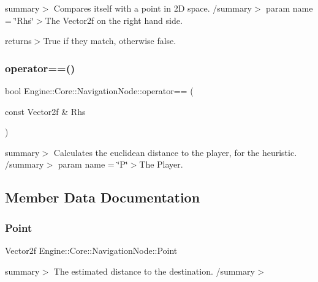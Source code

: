 summary$>$ Compares itself with a point in 2D space. /summary$>$ param name = \char`\"{}\+Rhs\char`\"{}$>$The Vector2f on the right hand side.

returns$>$True if they match, otherwise false.\mbox{\label{struct_engine_1_1_core_1_1_navigation_node_a4093291628771c2de79b2b1a8ea2ec82}} 
\subsubsection{\texorpdfstring{operator==()}{operator==()}\hspace{0.1cm}{\footnotesize\ttfamily [2/2]}}
{\footnotesize\ttfamily bool Engine\+::\+Core\+::\+Navigation\+Node\+::operator== (\begin{DoxyParamCaption}\item[{const Vector2f \&}]{Rhs }\end{DoxyParamCaption})}

summary$>$ Calculates the euclidean distance to the player, for the heuristic. /summary$>$ param name = \char`\"{}\+P\char`\"{}$>$The Player.

\subsection{Member Data Documentation}
\mbox{\label{struct_engine_1_1_core_1_1_navigation_node_a09e7506d996f8bd91b478f3e013fd48e}} 
\subsubsection{\texorpdfstring{Point}{Point}}
{\footnotesize\ttfamily Vector2f Engine\+::\+Core\+::\+Navigation\+Node\+::\+Point}

summary$>$ The estimated distance to the destination. /summary$>$ \mbox{\label{struct_engine_1_1_core_1_1_navigation_node_a7a1470734947944ba351df516e2a7cc1}} 
